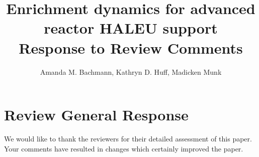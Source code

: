 \documentclass[answers,11pt]{exam}
\begin{document}


%

\title{Enrichment dynamics for advanced reactor HALEU support\\
        \large Response to Review Comments}
\author{Amanda M. Bachmann, Kathryn D. Huff, Madicken Munk}



%
\maketitle
\section*{Review General Response}
We would like to thank the reviewers for their detailed assessment of this
paper. Your comments have resulted in changes which certainly improved the
paper.
\end{document}
